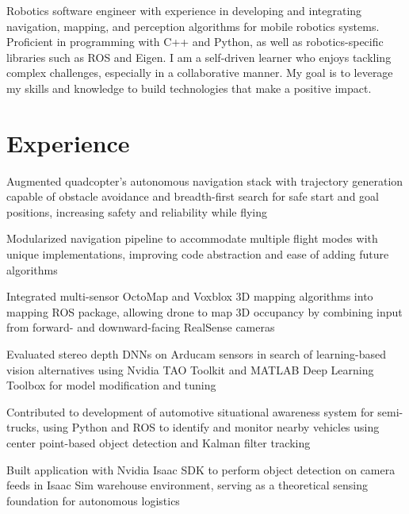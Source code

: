 \documentclass{resume}
\begin{document}


\begin{personalstatement}
    Robotics software engineer with experience in developing and integrating navigation, mapping, and perception algorithms for mobile robotics systems. Proficient in programming with C++ and Python, as well as robotics-specific libraries such as ROS and Eigen. I am a self-driven learner who enjoys tackling complex challenges, especially in a collaborative manner. My goal is to leverage my skills and knowledge to build technologies that make a positive impact.
\end{personalstatement}
    
\section{Experience}

\begin{details}
    \item Augmented quadcopter’s autonomous navigation stack with trajectory generation capable of obstacle avoidance and breadth-first search for safe start and goal positions, increasing safety and reliability while flying
    \item Modularized navigation pipeline to accommodate multiple flight modes with unique implementations, improving code abstraction and ease of adding future algorithms
    \item Integrated multi-sensor OctoMap and Voxblox 3D mapping algorithms into mapping ROS package, allowing drone to map 3D occupancy by combining input from forward- and downward-facing RealSense cameras
    \item Evaluated stereo depth DNNs on Arducam sensors in search of learning-based vision alternatives using Nvidia TAO Toolkit and MATLAB Deep Learning Toolbox for model modification and tuning
\end{details}

\begin{details}
    \item Contributed to development of automotive situational awareness system for semi-trucks, using Python and ROS to identify and monitor nearby vehicles using center point-based object detection and Kalman filter tracking
    \item Built application with Nvidia Isaac SDK to perform object detection on camera feeds in Isaac Sim warehouse environment, serving as a theoretical sensing foundation for autonomous logistics
\end{details}
\end{document}
